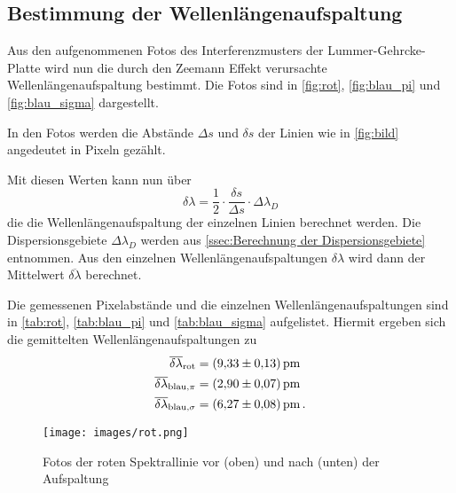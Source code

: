 \subsection{Bestimmung der Wellenlängenaufspaltung}
\label{ssec:Bestimmung der Wellenlängenaufspaltung}

Aus den aufgenommenen Fotos des Interferenzmusters der Lummer-Gehrcke-Platte wird nun die durch den Zeemann Effekt verursachte Wellenlängenaufspaltung bestimmt.
Die Fotos sind in \autoref{fig:rot}, \autoref{fig:blau_pi} und \autoref{fig:blau_sigma} dargestellt.

In den Fotos werden die Abstände $\Delta s$ und $\delta s$ der Linien wie in \autoref{fig:bild} angedeutet in Pixeln gezählt.

Mit diesen Werten kann nun über 
\begin{equation}
    \delta \lambda = \frac{1}{2}\cdot\frac{\delta s}{\Delta s}\cdot\Delta \lambda_D
    \label{eq:delta_lambda}
\end{equation}
die die Wellenlängenaufspaltung der einzelnen Linien berechnet werden.
Die Dispersionsgebiete $\Delta\lambda_D$ werden aus \autoref{ssec:Berechnung der Dispersionsgebiete} entnommen.
Aus den einzelnen Wellenlängenaufspaltungen $\delta \lambda$ wird dann der Mittelwert $\overline{\delta\lambda}$ berechnet.

Die gemessenen Pixelabstände und die einzelnen Wellenlängenaufspaltungen sind in \autoref{tab:rot}, \autoref{tab:blau_pi} und \autoref{tab:blau_sigma} aufgelistet.
Hiermit ergeben sich die gemittelten Wellenlängenaufspaltungen zu 
\begin{align*}
    \overline{\delta \lambda}_\text{rot} &= \SI{9.33+-0.13}{\pico\meter} \\
    \overline{\delta \lambda}_{\text{blau,}\pi} &= \SI{2.90+-0.07}{\pico\meter} \\
    \overline{\delta \lambda}_{\text{blau,}\sigma} &= \SI{6.27+-0.08}{\pico\meter} \, .
\end{align*}

\newpage

\begin{figure}[h]
    \centering
    \texttt{[image: images/rot.png]}
    \caption{Fotos der roten Spektrallinie vor (oben) und nach (unten) der Aufspaltung}
    \label{fig:rot}
\end{figure}

